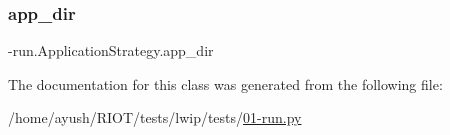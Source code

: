 \subsubsection{\texorpdfstring{app\+\_\+dir}{app\_dir}}
{\footnotesize{}-\/run.\+Application\+Strategy.\+app\+\_\+dir}



The documentation for this class was generated from the following file\+:\begin{DoxyCompactItemize}
\item 
/home/ayush/\+R\+I\+O\+T/tests/lwip/tests/\hyperlink{lwip_2tests_201-run_8py}{01-\/run.\+py}\end{DoxyCompactItemize}
